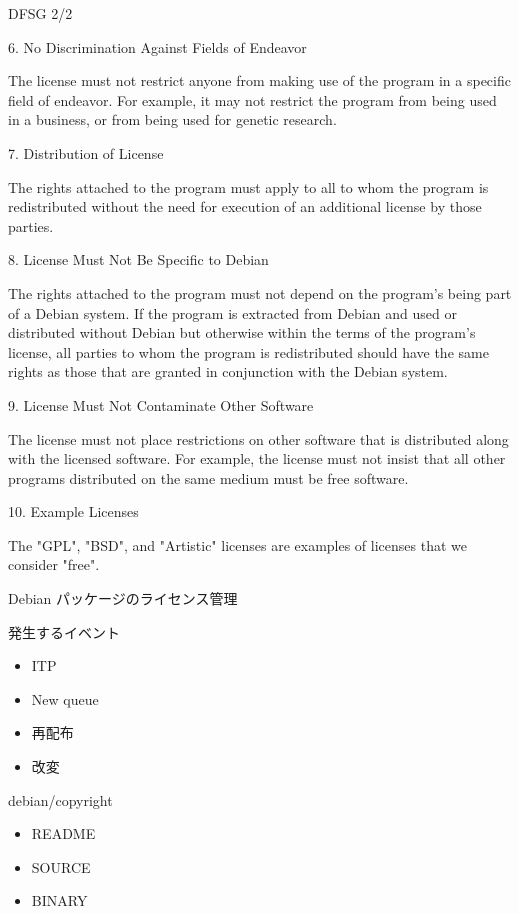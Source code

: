 \documentclass[cjk,dvipdfmx,12pt]{beamer}
\begin{document}
\begin{frame}{DFSG 2/2}

{\scriptsize
    6. No Discrimination Against Fields of Endeavor

       The license must not restrict anyone from making use of the
       program in a specific field of endeavor. For example, it may not
       restrict the program from being used in a business, or from being
       used for genetic research.

    7. Distribution of License

       The rights attached to the program must apply to all to whom the
       program is redistributed without the need for execution of an
       additional license by those parties.

    8. License Must Not Be Specific to Debian

       The rights attached to the program must not depend on the
       program's being part of a Debian system. If the program is
       extracted from Debian and used or distributed without Debian but
       otherwise within the terms of the program's license, all parties
       to whom the program is redistributed should have the same rights
       as those that are granted in conjunction with the Debian system.

    9. License Must Not Contaminate Other Software

       The license must not place restrictions on other software that is
       distributed along with the licensed software. For example, the
       license must not insist that all other programs distributed on the
       same medium must be free software.

   10. Example Licenses

       The "GPL", "BSD", and "Artistic" licenses are examples of licenses
       that we consider "free".
 }
\end{frame}

\begin{frame}{Debian パッケージのライセンス管理}

発生するイベント
\begin{itemize}
 \item ITP
 \item New queue
 \item 再配布
 \item 改変
\end{itemize}
\end{frame}

\begin{frame}{debian/copyright}
\begin{itemize}
 \item README
 \item SOURCE
 \item BINARY
\end{itemize} 
\end{frame}
\end{document}
